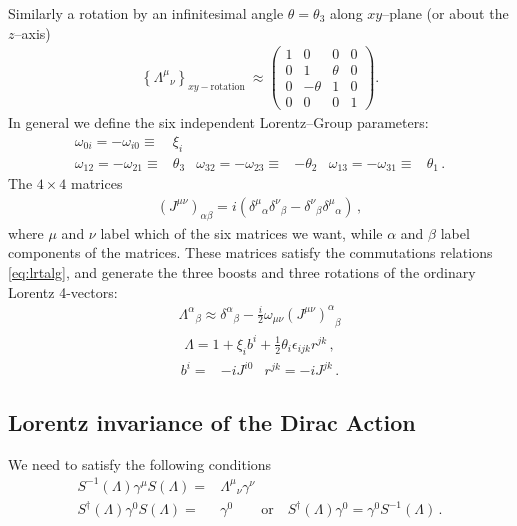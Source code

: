 Similarly a rotation by an infinitesimal angle $\theta=\theta_3$ along $xy$--plane (or about the $z$--axis)
\begin{align}
  \left\{{\Lambda^\mu}_{\nu}\right\}_{xy-\text{rotation }}\approx
  \begin{pmatrix}
    1&0&0&0\\
    0&1&\theta&0\\
    0&-\theta&1&0\\
    0&0&0&1
  \end{pmatrix}.
\end{align}
In general we define the six independent Lorentz--Group parameters:
\begin{align}
  \omega_{0i}=-\omega_{i0}\equiv&\xi_i \nonumber\\
  \omega_{12}=-\omega_{21}\equiv&\theta_3 &   \omega_{32}=-\omega_{23}\equiv&-\theta_2 &   \omega_{13}=-\omega_{31}\equiv&\theta_1\,.
\end{align}
The $4\times 4$ matrices
\begin{align}
  \left(J^{\mu\nu}\right)_{\alpha\beta}=i\left({\delta^\mu}_\alpha{\delta^\nu}_\beta-{\delta^\nu}_\beta{\delta^\mu}_\alpha\right)\,,
\end{align}
where $\mu$ and $\nu$ label which of the six matrices we want, while $\alpha$ and $\beta$ label components of the matrices. These matrices satisfy the commutations relations \eqref{eq:lrtalg}, and generate the three boosts and three rotations of the ordinary Lorentz 4-vectors:
\begin{align}
  {\Lambda^\alpha}_\beta\approx{\delta^\alpha}_\beta-\frac{i}{2}\omega_{\mu\nu}{\left(J^{\mu\nu}\right)^\alpha}_\beta
\end{align}
\begin{align}
\label{eq:lorentzrep}
  \Lambda=1+\xi_ib^i+\frac{1}{2}\theta_i\epsilon_{i j k}r^{jk}\,,
\end{align}
\begin{align}
 b^i=&-i J^{i0} & r^{jk}=-i J^{j k}\,.
\end{align}

\subsection{Lorentz invariance of the Dirac Action}
We need to satisfy the following conditions
\begin{align}
  S^{-1}(\Lambda) \gamma^\mu S(\Lambda)=&{\Lambda^\mu}_\nu\gamma^\nu\nonumber\\
  S^\dagger(\Lambda) \gamma^0 S(\Lambda)=&\gamma^0\qquad\text{or}\quad S^\dagger(\Lambda) \gamma^0= \gamma^0S^{-1}(\Lambda)\, .
\end{align}

